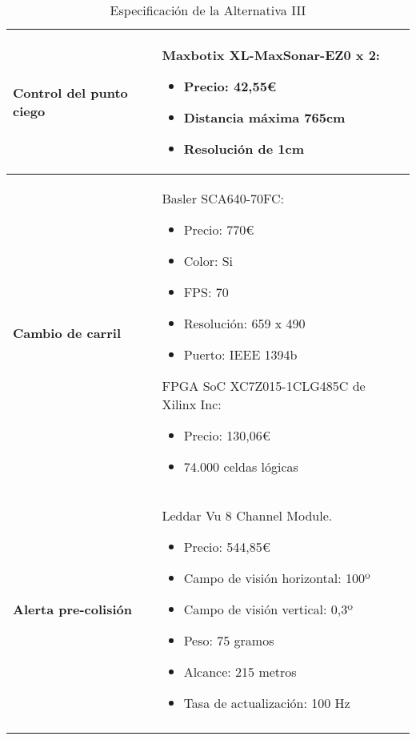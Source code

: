 \begin{center}
\begin{longtable}{p{5cm} p{8cm}}
\textbf{Control del punto ciego} &
Maxbotix XL-MaxSonar-EZ0 x 2:
\begin{itemize}
    \item Precio: 42,55\euro
    \item Distancia máxima 765cm
    \item Resolución de 1cm
\end{itemize}
\\ \hline

\textbf{Cambio de carril} &
Basler SCA640-70FC:
\begin{itemize}
    \item Precio: 770\euro
    \item Color: Si
    \item FPS: 70
    \item Resolución: 659 x 490
    \item Puerto: IEEE 1394b
\end{itemize}
FPGA SoC XC7Z015-1CLG485C de Xilinx Inc:
\begin{itemize}
    \item Precio: 130,06\euro
    \item 74.000 celdas lógicas
\end{itemize}
\\ \hline

\textbf{Alerta pre-colisión} &
Leddar Vu 8 Channel Module.
\begin{itemize}
    \item Precio: 544,85\euro
    \item Campo de visión horizontal: 100º
    \item Campo de visión vertical: 0,3º
    \item Peso: 75 gramos
    \item Alcance: 215 metros
    \item Tasa de actualización: 100 Hz
\end{itemize}
\\ \hline
\caption{Especificación de la Alternativa III}
\label{tab:altIII}
\end{longtable}
\end{center}
